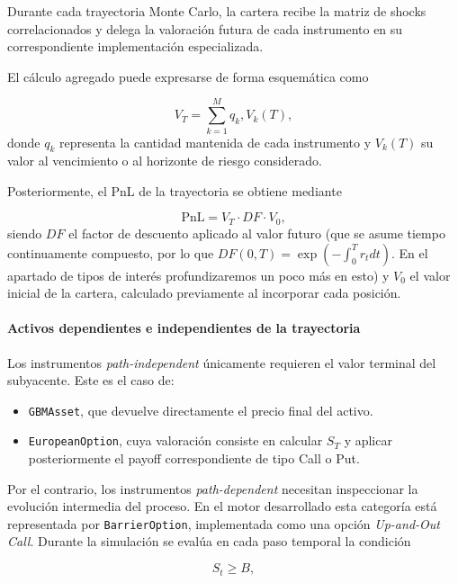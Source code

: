 \documentclass[11pt]{article}
\begin{document}
Durante cada trayectoria Monte Carlo, la cartera recibe la matriz de shocks correlacionados y delega la valoración futura de cada instrumento en su correspondiente implementación especializada.

El cálculo agregado puede expresarse de forma esquemática como

\begin{equation}
V_T =
\sum_{k=1}^{M}
q_k ,
V_k(T),
\end{equation}
donde $q_k$ representa la cantidad mantenida de cada instrumento y $V_k(T)$ su valor al vencimiento o al horizonte de riesgo considerado.

Posteriormente, el PnL de la trayectoria se obtiene mediante

\begin{equation}
\text{PnL} =
V_T \cdot DF \cdot
V_0,
\label{eq:pnl}
\end{equation}
siendo \(DF\) el factor de descuento aplicado al valor futuro (que se asume tiempo continuamente compuesto, por lo que $DF(0,T)=\exp(-\int_{0}^{T}r_tdt)$. En el apartado de tipos de interés profundizaremos un poco más en esto) y \(V_0\) el valor inicial de la cartera, calculado previamente al incorporar cada posición.

\paragraph{Activos dependientes e independientes de la trayectoria}

Los instrumentos \emph{path-independent} únicamente requieren el valor terminal del subyacente. Este es el caso de:

\begin{itemize}
\item \texttt{GBMAsset}, que devuelve directamente el precio final del activo.
\item \texttt{EuropeanOption}, cuya valoración consiste en calcular \(S_T\) y aplicar posteriormente el payoff correspondiente de tipo Call o Put.
\end{itemize}

Por el contrario, los instrumentos \emph{path-dependent} necesitan inspeccionar la evolución intermedia del proceso. En el motor desarrollado esta categoría está representada por \texttt{BarrierOption}, implementada como una opción \emph{Up-and-Out Call}. Durante la simulación se evalúa en cada paso temporal la condición

\begin{equation}
S_t \geq B,
\end{equation}
\end{document}
